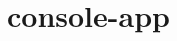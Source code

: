 \chapter{console-\/app}
\hypertarget{md__r_e_a_d_m_e}{}\label{md__r_e_a_d_m_e}
\label{md__r_e_a_d_m_e_autotoc_md0}%
%
